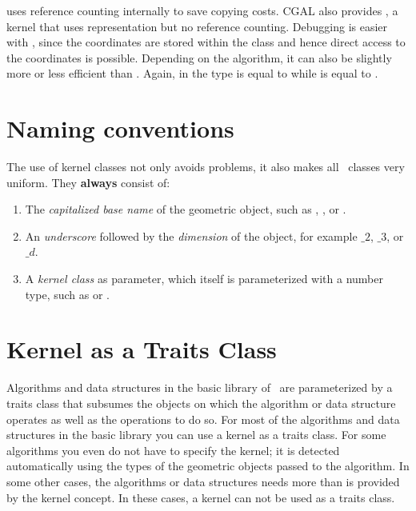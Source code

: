  uses reference counting internally
to save copying costs. CGAL also provides
, a kernel that uses
 representation but no reference
counting. Debugging is easier with
, since the coordinates are
stored within the class and hence direct access to the coordinates is
possible. Depending on the algorithm, it can also be slightly more or
less efficient than . Again, in
 the type
 is equal to
 while
 is equal to
.

\section{Naming conventions}

The use of kernel classes not only avoids problems, it also makes all
\cgal\ classes very uniform. They {\bf always} consist of:
\begin{enumerate}
\begin{ccTexOnly}
\itemsep0pt\parskip0pt
\end{ccTexOnly}

\item The {\em capitalized base name} of the geometric object, such as 
      , , or .

\item An {\em underscore} followed by the {\em dimension} of the object, 
      for example $\_2$, $\_3$, or $\_d$.
      
    \item A {\em kernel class} as parameter, which itself is
      parameterized with a number type, such as
       or
      .
\end{enumerate}

\section{Kernel as a Traits Class}
Algorithms and data structures in the basic library of \cgal\ are
parameterized by a traits class that subsumes the objects on which the
algorithm or data structure operates as well as the operations to do
so. For most of the algorithms and data structures in the basic
library you can use a kernel as a traits class. For some algorithms
you even do not have to specify the kernel; it is detected
automatically using the types of the geometric objects passed to the
algorithm. In some other cases, the algorithms or data structures
needs more than is provided by the kernel concept. In these cases, a
kernel can not be used as a traits class.

